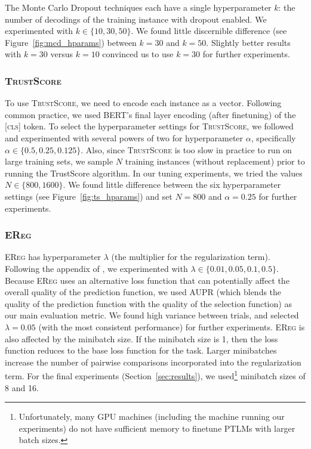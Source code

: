 \documentclass[11pt]{article}
\begin{document}
The Monte Carlo Dropout techniques each have a single hyperparameter $k$: the number of decodings of the training instance with dropout enabled. We experimented with $k \in \{10, 30, 50\}$. We found little discernible difference (see Figure~\ref{fig:mcd_hparams}) between $k=30$ and $k=50$. Slightly better results with $k=30$ versus $k=10$ convinced us to use $k=30$ for further experiments.


\subsubsection*{\textsc{TrustScore}}

To use \textsc{TrustScore}, we need to encode each instance as a vector. Following common practice, we used BERT's final layer encoding (after finetuning) of the \textsc{[cls]} token. To select the hyperparameter settings for \textsc{TrustScore}, we followed \cite{jiang2018trust} and experimented with several powers of two for hyperparameter $\alpha$, specifically $\alpha \in \{0.5, 0.25, 0.125\}$. Also, since \textsc{TrustScore} is too slow in practice to run on large training sets, we sample $N$ training instances (without replacement) prior to running the TrustScore algorithm. In our tuning experiments, we tried the values $N \in \{800, 1600\}$. We found little difference between the six hyperparameter settings (see Figure~\ref{fig:ts_hparams}) and set $N=800$ and $\alpha=0.25$ for further experiments.

\subsubsection*{\textsc{EReg}}

\textsc{EReg} has hyperparameter $\lambda$ (the multiplier for the regularization term). Following the appendix of \cite{xin-etal-2021-art}, we experimented with $\lambda \in \{0.01, 0.05, 0.1, 0.5\}$. Because \textsc{EReg} uses an alternative loss function that can potentially affect the overall quality of the prediction function, we used AUPR (which blends the quality of the prediction function with the quality of the selection function) as our main evaluation metric. We found high variance between trials, and selected $\lambda = 0.05$ (with the most consistent performance) for further experiments. \textsc{EReg} is also affected by the minibatch size. If the minibatch size is 1, then the loss function reduces to the base loss function for the task. Larger minibatches increase the number of pairwise comparisons incorporated into the regularization term. For the final experiments (Section~\ref{sec:results}), we used\footnote{Unfortunately, many GPU machines (including the machine running our experiments) do not have sufficient memory to finetune PTLMs with larger batch sizes.} minibatch sizes of 8 and 16.
\end{document}
